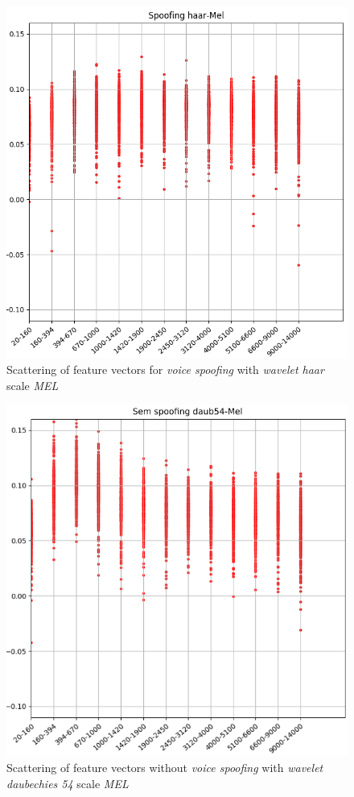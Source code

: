 		\begin{figure}[!h]
			\centering
			\includegraphics[width=.70\linewidth, height=.68\linewidth]{images/results/barkVersusMel/spoofingHaarMel}
			\caption{Scattering of feature vectors for \textit{voice spoofing} with \textit{wavelet haar} scale \textit{MEL}}
			\label{fig:spoofinghaarmel}
		\end{figure}
		
		\begin{figure}[!h]
			\centering
			\includegraphics[width=.70\linewidth, height=.68\linewidth]{images/results/barkVersusMel/liveDaub54Mel}
			\caption{Scattering of feature vectors without \textit{voice spoofing} with \textit{wavelet daubechies 54} scale \textit{MEL}}
			\label{fig:livedaub54mel}
		\end{figure}
		
